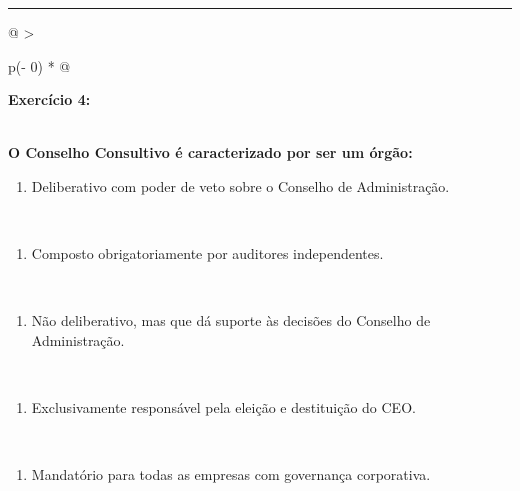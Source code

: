 \documentclass[
]{book}
\providecommand{\tightlist}{%
  \setlength{\itemsep}{0pt}\setlength{\parskip}{0pt}}
\begin{document}
\begin{center}\rule{0.5\linewidth}{0.5pt}\end{center}

\begin{longtable}[]{@{}
  >{\raggedright\arraybackslash}p{(\columnwidth - 0\tabcolsep) * }@{}}
\toprule\noalign{}
\begin{minipage}[b]{\linewidth}\raggedright
\textbf{Exercício 4:}
\end{minipage} \\
\midrule\noalign{}
\endhead
\bottomrule\noalign{}
\endlastfoot
\textbf{O Conselho Consultivo é caracterizado por ser um órgão:} \\
\begin{minipage}[t]{\linewidth}\raggedright
\begin{enumerate}
\def\labelenumi{\alph{enumi})}
\tightlist
\item
  Deliberativo com poder de veto sobre o Conselho de Administração.
\end{enumerate}
\end{minipage} \\
\begin{minipage}[t]{\linewidth}\raggedright
\begin{enumerate}
\def\labelenumi{\alph{enumi})}
\setcounter{enumi}{1}
\tightlist
\item
  Composto obrigatoriamente por auditores independentes.
\end{enumerate}
\end{minipage} \\
\begin{minipage}[t]{\linewidth}\raggedright
\begin{enumerate}
\def\labelenumi{\alph{enumi})}
\setcounter{enumi}{2}
\tightlist
\item
  Não deliberativo, mas que dá suporte às decisões do Conselho de Administração.
\end{enumerate}
\end{minipage} \\
\begin{minipage}[t]{\linewidth}\raggedright
\begin{enumerate}
\def\labelenumi{\alph{enumi})}
\setcounter{enumi}{3}
\tightlist
\item
  Exclusivamente responsável pela eleição e destituição do CEO.
\end{enumerate}
\end{minipage} \\
\begin{minipage}[t]{\linewidth}\raggedright
\begin{enumerate}
\def\labelenumi{\alph{enumi})}
\setcounter{enumi}{4}
\tightlist
\item
  Mandatório para todas as empresas com governança corporativa.
\end{enumerate}
\end{minipage} \\
\end{longtable}
\end{document}
